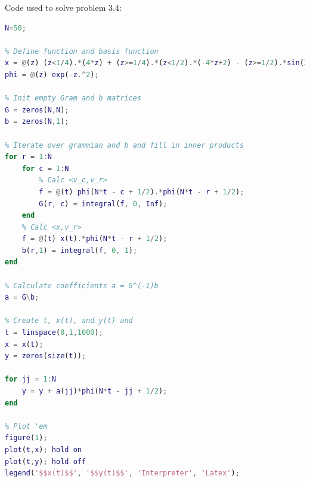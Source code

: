 \documentclass[12pt]{article}
\begin{document}
\begin{enumerate}
\begin{enumerate}
\pagebreak

Code used to solve problem 3.4:

\begin{lstlisting}[language=matlab]
N=50;

% Define function and basis function
x = @(z) (z<1/4).*(4*z) + (z>=1/4).*(z<1/2).*(-4*z+2) - (z>=1/2).*sin(20*pi*z);
phi = @(z) exp(-z.^2);

% Init empty Gram and b matrices
G = zeros(N,N);
b = zeros(N,1);

% Iterate over grammian and b and fill in inner products
for r = 1:N
    for c = 1:N
        % Calc <v_c,v_r>
        f = @(t) phi(N*t - c + 1/2).*phi(N*t - r + 1/2);
        G(r, c) = integral(f, 0, Inf);
    end
    % Calc <x,v_r>
    f = @(t) x(t).*phi(N*t - r + 1/2);
    b(r,1) = integral(f, 0, 1);
end

% Calculate coefficients a = G^(-1)b
a = G\b;

% Create t, x(t), and y(t) and 
t = linspace(0,1,1000);
x = x(t);
y = zeros(size(t));

for jj = 1:N
    y = y + a(jj)*phi(N*t - jj + 1/2);
end

% Plot 'em
figure(1);
plot(t,x); hold on
plot(t,y); hold off
legend('$$x(t)$$', '$$y(t)$$', 'Interpreter', 'Latex');
\end{lstlisting}

\end{enumerate}

\end{enumerate}
\end{document}
